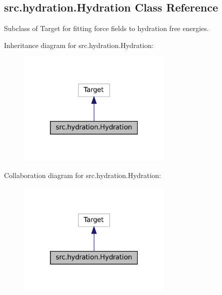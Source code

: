 \hypertarget{classsrc_1_1hydration_1_1Hydration}{}\subsection{src.\+hydration.\+Hydration Class Reference}
\label{classsrc_1_1hydration_1_1Hydration}


Subclass of Target for fitting force fields to hydration free energies.  




Inheritance diagram for src.\+hydration.\+Hydration\+:
\nopagebreak
\begin{figure}[H]
\begin{center}
\leavevmode
\includegraphics[width=211pt]{classsrc_1_1hydration_1_1Hydration__inherit__graph}
\end{center}
\end{figure}


Collaboration diagram for src.\+hydration.\+Hydration\+:
\nopagebreak
\begin{figure}[H]
\begin{center}
\leavevmode
\includegraphics[width=211pt]{classsrc_1_1hydration_1_1Hydration__coll__graph}
\end{center}
\end{figure}
